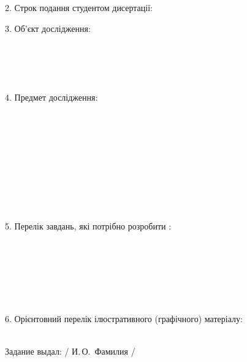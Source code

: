 \documentclass[]{lib/styles/additional-docs}
\begin{document}
  \vspace{1em}

  2. Строк подання студентом дисертації: \lineunderscore

  \vspace{1em}

  3. Об’єкт дослідження:
  \lineunderscore\\
  \lineunderscore\\
  \lineunderscore\\
  \lineunderscore\\
  \lineunderscore\\
  \lineunderscore

  \vspace{1em}

  4. Предмет дослідження:
  \lineunderscore\\
  \lineunderscore\\
  \lineunderscore\\
  \lineunderscore\\
  \lineunderscore\\
  \lineunderscore\\
  \lineunderscore\\
  \lineunderscore\\
  \lineunderscore\\
  \lineunderscore\\
  \lineunderscore

  \clearpage
  \thispagestyle{empty}

  5. Перелік  завдань,  які  потрібно  розробити :
  \lineunderscore\\
  \lineunderscore\\
  \lineunderscore\\
  \lineunderscore\\
  \lineunderscore\\
  \lineunderscore\\
  \lineunderscore\\
  \lineunderscore

  \vspace{1em}

  6. Орієнтовний  перелік  ілюстративного  (графічного)  матеріалу:
  \lineunderscore\\
  \lineunderscore\\
  \lineunderscore

  Задание выдал: \hfill{} \uline{\hspace*{6em}} / И.\,О.~Фамилия /   

  \vspace{1em}
\end{document}
